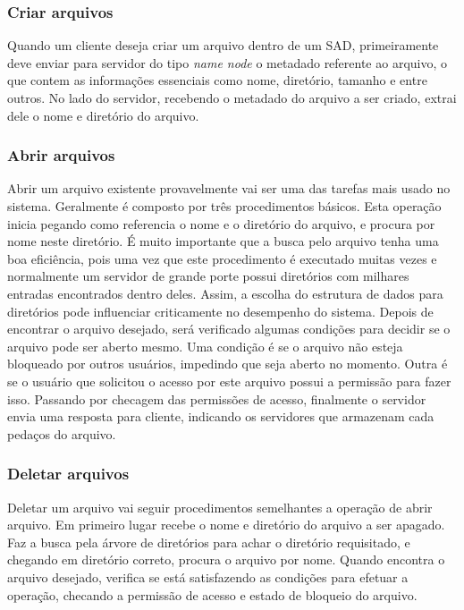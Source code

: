 	\subsubsection{Criar arquivos}
	
	Quando um cliente deseja criar um arquivo dentro de um SAD, primeiramente deve enviar para servidor do tipo \textit{name node} o metadado referente ao arquivo, o que contem as informações essenciais como nome, diretório, tamanho e entre outros. No lado do servidor, recebendo o metadado do arquivo a ser criado, extrai dele o nome e diretório do arquivo. 
	
	\subsubsection{Abrir arquivos}
	
	Abrir um arquivo existente provavelmente vai ser uma das tarefas mais usado no sistema. Geralmente é composto por três procedimentos básicos. Esta operação inicia pegando como referencia o nome e o diretório do arquivo, e procura por nome neste diretório. É muito importante que a busca pelo arquivo tenha uma boa eficiência, pois uma vez que este procedimento é executado muitas vezes e normalmente um servidor de grande porte possui  diretórios com milhares entradas encontrados dentro deles. Assim, a escolha do estrutura de dados para diretórios pode influenciar criticamente no desempenho do sistema. Depois de encontrar o arquivo desejado, será verificado algumas condições para decidir se o arquivo pode ser aberto mesmo. Uma condição é se o arquivo não esteja bloqueado por outros usuários, impedindo que seja aberto no momento. Outra é se o usuário que solicitou o acesso por este arquivo possui a permissão para fazer isso. Passando por checagem das permissões de acesso, finalmente o servidor envia uma resposta para cliente, indicando os servidores que armazenam cada pedaços do arquivo.
	 
	\subsubsection{Deletar arquivos}
	Deletar um arquivo vai seguir procedimentos semelhantes a operação de abrir arquivo. Em primeiro lugar recebe o nome e diretório do arquivo a ser apagado. Faz a busca pela árvore de diretórios para achar o diretório requisitado, e chegando em diretório correto, procura o arquivo por nome. Quando encontra o arquivo desejado, verifica se está satisfazendo as condições para efetuar a operação, checando a permissão de acesso e estado de bloqueio do arquivo.  
	
